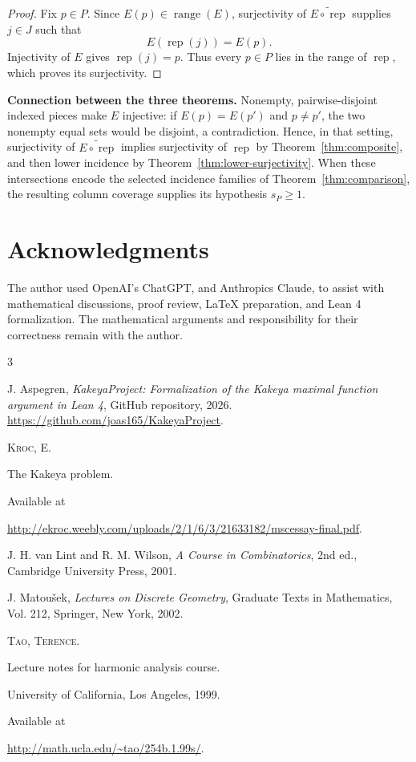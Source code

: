 \documentclass[11pt, letterpaper]{nyjm}
\newcommand{\range}{\operatorname{range}}
\newcommand{\rep}{\operatorname{rep}}
\begin{document}
\begin{proof}
	Fix $p\in P$. Since $E(p)\in\range(E)$, surjectivity of
	$\widetilde{E\circ\rep}$ supplies $j\in J$ such that
	\[
	E(\rep(j))=E(p).
	\]
	Injectivity of $E$ gives $\rep(j)=p$. Thus every $p\in P$ lies in
	the range of $\rep$, which proves its surjectivity.
\end{proof}

\noindent
\textbf{Connection between the three theorems.}
Nonempty, pairwise-disjoint indexed pieces make $E$ injective: if
$E(p)=E(p')$ and $p\ne p'$, the two nonempty equal sets would be
disjoint, a contradiction. Hence, in that setting, surjectivity of
$\widetilde{E\circ\rep}$ implies surjectivity of $\rep$ by
Theorem~\ref{thm:composite}, and then lower incidence by
Theorem~\ref{thm:lower-surjectivity}. When these intersections encode the
selected incidence families of Theorem~\ref{thm:comparison}, the
resulting column coverage supplies its hypothesis $s_P\geq1$.



\section*{Acknowledgments}

The author used OpenAI's ChatGPT, and Anthropics Claude, to assist with
mathematical discussions, proof review, LaTeX
preparation, and Lean 4 formalization.
The mathematical arguments and responsibility
for their correctness remain with the author.

\begin{thebibliography}{3}
	
	J. Aspegren,
	\emph{KakeyaProject: Formalization of the Kakeya maximal function argument in Lean 4},
	GitHub repository, 2026.
	\url{https://github.com/joas165/KakeyaProject}.
	
	
	
	{\scshape Kroc, E.} 
	
	The Kakeya problem. 
	
	Available at 
	
	\url{http://ekroc.weebly.com/uploads/2/1/6/3/21633182/mscessay-final.pdf}.
	
	J. H. van Lint and R. M. Wilson,
	\textit{A Course in Combinatorics},
	2nd ed., Cambridge University Press, 2001.
	
	J. Matou\v{s}ek,
	\textit{Lectures on Discrete Geometry},
	Graduate Texts in Mathematics, Vol. 212,
	Springer, New York, 2002.
	
	
	{\scshape Tao, Terence.}
	
	Lecture notes for harmonic analysis course. 
	
	University of California, Los Angeles, 1999. 
	
	Available at 
	
	\url{http://math.ucla.edu/~tao/254b.1.99s/}.
	
	
	
	
\end{thebibliography}
\end{document}
